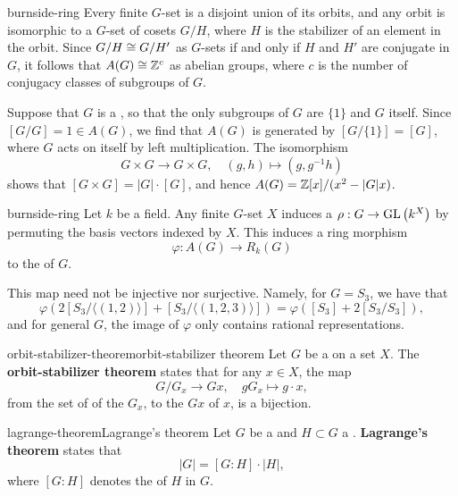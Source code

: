 \begin{example}{burnside-ring}
    Every finite $G$-set is a disjoint union of its orbits, and any orbit is isomorphic to a $G$-set of cosets $G/H$, where $H$ is the stabilizer of an element in the orbit. Since $G/H \cong G/H'$ as $G$-sets if and only if $H$ and $H'$ are conjugate in $G$, it follows that $A(G) \cong \mathbb{Z}^c$ as abelian groups, where $c$ is the number of conjugacy classes of subgroups of $G$.
    
    Suppose that $G$ is a , so that the only subgroups of $G$ are $\{ 1 \}$ and $G$ itself. Since $[G/G] = 1 \in A(G)$, we find that $A(G)$ is generated by $[G / \{ 1 \}] = [G]$, where $G$ acts on itself by left multiplication. The isomorphism
    \[ G \times G \to G \times G, \quad (g, h) \mapsto (g, g^{-1} h) \]
    shows that $[G \times G] = |G| \cdot [G]$, and hence $A(G) = \mathbb{Z}[x] / (x^2 - |G| x)$.
\end{example}

\begin{example}{burnside-ring}
    Let $k$ be a field. Any finite $G$-set $X$ induces a  $\rho : G \to \textup{GL}\left(k^X\right)$ by permuting the basis vectors indexed by $X$. This induces a ring morphism
    \[ \varphi : A(G) \to R_k(G) \]
    to the  of $G$.
    
    This map need not be injective nor surjective. Namely, for $G = S_3$, we have that
    \[ \varphi(2 [S_3 / \langle (1, 2) \rangle] + [S_3 / \langle (1, 2, 3) \rangle]) = \varphi([S_3] + 2 [S_3 / S_3]) , \]
    and for general $G$, the image of $\varphi$ only contains rational representations.
\end{example}

\begin{topic}{orbit-stabilizer-theorem}{orbit-stabilizer theorem}
    Let $G$ be a   on a set $X$. The \textbf{orbit-stabilizer theorem} states that for any $x \in X$, the map
    \[ G/G_x \to Gx , \quad g G_x \mapsto g \cdot x , \]
    from the set of  of the  $G_x$, to the  $Gx$ of $x$, is a bijection.
\end{topic}

\begin{topic}{lagrange-theorem}{Lagrange's theorem}
    Let $G$ be a  and $H \subset G$ a . \textbf{Lagrange's theorem} states that
    \[ |G| = [G : H] \cdot |H| , \]
    where $[G : H]$ denotes the  of $H$ in $G$.
\end{topic}

